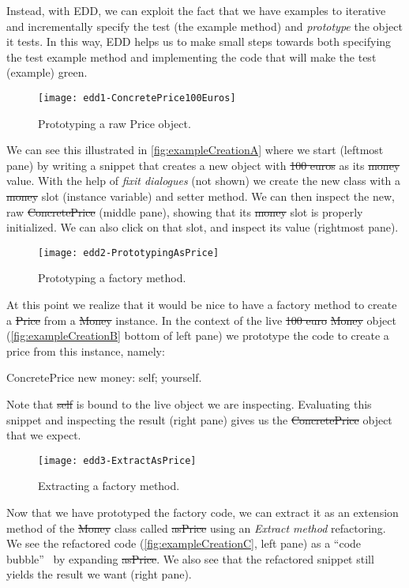 \documentclass[sigplan,anonymous,review,10pt]{acmart}
\begin{document}
Instead, with EDD, we can exploit the fact that we have examples to iterative and incrementally specify the test (\ie the example method) and \emph{prototype} the object it tests.
In this way, EDD helps us to make small steps towards both specifying the test example method and implementing the code that will make the test (example) green.

\begin{figure}[h]
  \texttt{[image: edd1-ConcretePrice100Euros]}
	\caption{Prototyping a raw Price object.}
  \label{fig:exampleCreationA}
\end{figure}

We can see this illustrated in \autoref{fig:exampleCreationA} where we start (leftmost pane) by writing a snippet that creates a new  object with \st{100 euros} as its \st{money} value.
With the help of \emph{fixit dialogues} (not shown) we create the new class with a \st{money} slot (instance variable) and setter method.
We can then inspect the new, raw \st{ConcretePrice} (middle pane), showing that its \st{money} slot is properly initialized.
We can also click on that slot, and inspect its value (rightmost pane).

\begin{figure}[h]
  \texttt{[image: edd2-PrototypingAsPrice]}
	\caption{Prototyping a factory method.}
  \label{fig:exampleCreationB}
\end{figure}

At this point we realize that it would be nice to have a factory method to create a \st{Price} from a \st{Money} instance.
In the context of the live \st{100 euro} \st{Money} object (\autoref{fig:exampleCreationB} bottom of left pane) we prototype the code to create a price from this instance, namely:
\begin{code}
ConcretePrice new money: self; yourself.
\end{code}
Note that \st{self} is bound to the live object we are inspecting.
Evaluating this snippet and inspecting the result (right pane) gives us the \st{ConcretePrice} object that we expect.

\begin{figure}[h]
  \texttt{[image: edd3-ExtractAsPrice]}
	\caption{Extracting a factory method.}
  \label{fig:exampleCreationC}
\end{figure}

Now that we have prototyped the factory code, we can extract it as an extension method of the \st{Money} class called \st{asPrice} using an \emph{Extract method} refactoring.
We see the refactored code (\autoref{fig:exampleCreationC}, left pane) as a ``code bubble''~\cite{Brag10a} by expanding \st{asPrice}.
We also see that the refactored snippet still yields the result we want (right pane).
\end{document}
